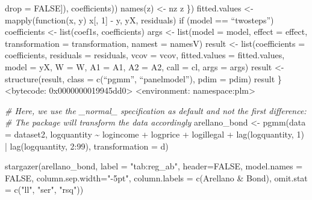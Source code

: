 \documentclass[
]{article}
\newenvironment{Shaded}{\begin{snugshade}}{\end{snugshade}}
\newcommand{\AttributeTok}[1]{\textcolor[rgb]{0.77,0.63,0.00}{#1}}
\newcommand{\CommentTok}[1]{\textcolor[rgb]{0.56,0.35,0.01}{\textit{#1}}}
\newcommand{\ConstantTok}[1]{\textcolor[rgb]{0.00,0.00,0.00}{#1}}
\newcommand{\DecValTok}[1]{\textcolor[rgb]{0.00,0.00,0.81}{#1}}
\newcommand{\FunctionTok}[1]{\textcolor[rgb]{0.00,0.00,0.00}{#1}}
\newcommand{\NormalTok}[1]{#1}
\newcommand{\OtherTok}[1]{\textcolor[rgb]{0.56,0.35,0.01}{#1}}
\newcommand{\SpecialCharTok}[1]{\textcolor[rgb]{0.00,0.00,0.00}{#1}}
\newcommand{\StringTok}[1]{\textcolor[rgb]{0.31,0.60,0.02}{#1}}
\let\oldShaded\Shaded
\let\endoldShaded\endShaded
\renewenvironment{Shaded}{\footnotesize\oldShaded}{\endoldShaded}
\begin{document}
drop = FALSE{]}), coefficients)) names(z) \textless- nz z \})
fitted.values \textless- mapply(function(x, y) x{[}, 1{]} - y, yX,
residuals) if (model == ``twosteps'') coefficients \textless-
list(coef1s, coefficients) args \textless- list(model = model, effect =
effect, transformation = transformation, namest = namesV) result
\textless- list(coefficients = coefficients, residuals = residuals, vcov
= vcov, fitted.values = fitted.values, model = yX, W = W, A1 = A1, A2 =
A2, call = cl, args = args) result \textless- structure(result, class =
c(``pgmm'', ``panelmodel''), pdim = pdim) result \} \textless bytecode:
0x0000000019945dd0\textgreater{} \textless environment:
namespace:plm\textgreater{}

\begin{Shaded}
\begin{Highlighting}[]
\CommentTok{\# Here, we use the \_normal\_ specification as default and not the first difference:}
\CommentTok{\# The package will transform the data accordingly}
\NormalTok{arellano\_bond }\OtherTok{\textless{}{-}} \FunctionTok{pgmm}\NormalTok{(}\AttributeTok{data =}\NormalTok{ dataset2,}
\NormalTok{                          logquantity }\SpecialCharTok{\textasciitilde{}}\NormalTok{ logincome }\SpecialCharTok{+}\NormalTok{ logprice }\SpecialCharTok{+} 
\NormalTok{                            logillegal }\SpecialCharTok{+} \FunctionTok{lag}\NormalTok{(logquantity, }\DecValTok{1}\NormalTok{)}
                          \SpecialCharTok{|} \FunctionTok{lag}\NormalTok{(logquantity, }\DecValTok{2}\SpecialCharTok{:}\DecValTok{99}\NormalTok{), }\AttributeTok{transformation =} \StringTok{\textquotesingle{}d\textquotesingle{}}\NormalTok{)}

\FunctionTok{stargazer}\NormalTok{(arellano\_bond, }\AttributeTok{label =} \StringTok{"tab:reg\_ab"}\NormalTok{, }\AttributeTok{header=}\ConstantTok{FALSE}\NormalTok{, }\AttributeTok{model.names =} \ConstantTok{FALSE}\NormalTok{,}
          \AttributeTok{column.sep.width=}\StringTok{"{-}5pt"}\NormalTok{,}
          \AttributeTok{column.labels =} \FunctionTok{c}\NormalTok{(}\StringTok{\textquotesingle{}Arellano \& Bond\textquotesingle{}}\NormalTok{),}
              \AttributeTok{omit.stat =} \FunctionTok{c}\NormalTok{(}\StringTok{"ll"}\NormalTok{, }\StringTok{"ser"}\NormalTok{, }\StringTok{"rsq"}\NormalTok{))}
\end{Highlighting}
\end{Shaded}
\end{document}
